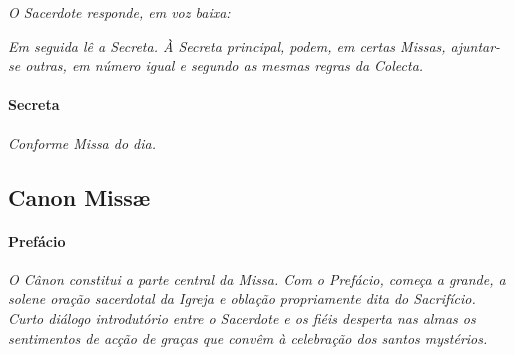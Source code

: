 \textit{O Sacerdote responde, em voz baixa:}

\begin{paracol}{2}\switchcolumn{}\end{paracol}

\textit{Em seguida lê a Secreta. À Secreta principal, podem, em certas Missas, ajuntar-se outras, em número igual e segundo as mesmas regras da Colecta.}

\paragraph{Secreta}

\emph{Conforme Missa do dia.}

\begin{paracol}{2}\switchcolumn{}\switchcolumn*{}\switchcolumn{}\end{paracol}

\subsection{Canon Missæ}

\paragraph{Prefácio}

\textit{O Cânon constitui a parte central da Missa. Com o Prefácio, começa a grande, a solene oração sacerdotal da Igreja e oblação propriamente dita do Sacrifício. Curto diálogo introdutório entre o Sacerdote e os fiéis desperta nas almas os sentimentos de acção de graças que convêm à celebração dos santos mystérios.}

\begin{paracol}{2}\switchcolumn{}\switchcolumn*{}\switchcolumn{}\switchcolumn*{}\switchcolumn{}\switchcolumn*{}\switchcolumn{}\switchcolumn*{}\switchcolumn{}\switchcolumn*{}\switchcolumn{}\end{paracol}


